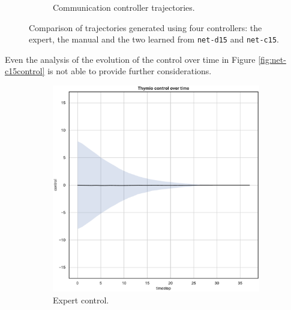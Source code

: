\begin{figure}[!htb]
\begin{center}
\begin{subfigure}[h]{0.49\textwidth}
			\caption{Communication controller trajectories.}
		\end{subfigure}
	\end{center}
	\caption[Evaluation of the trajectories learned by \texttt{net-c15}.]{Comparison 
	of trajectories generated using four controllers: the 
		expert, the manual and the two learned from \texttt{net-d15} and 
		\texttt{net-c15}.}
	\label{fig:net-c15traj}
\end{figure}

Even the analysis of the evolution of the control over time in Figure 
\ref{fig:net-c15control} is not able to provide further considerations.
\begin{figure}[H]
	\begin{center}
		\begin{subfigure}[h]{0.35\textwidth}
			\includegraphics[width=\textwidth]{contents/images/net-d15/control-overtime-omniscient}%
			\caption{Expert control.}
		\end{subfigure}
		\hspace{1cm}
		\begin{subfigure}[h]{0.35\textwidth}

\end{subfigure}
\end{center}
\end{figure}
